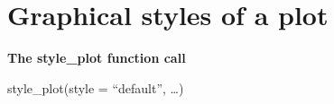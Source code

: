 \documentclass[
  letterpaper,
  DIV=11,
  numbers=noendperiod]{scrreprt}
\begin{document}
\hypertarget{graphical-styles-of-a-plot}{%
\section{Graphical styles of a plot}\label{graphical-styles-of-a-plot}}

\begin{tcolorbox}[enhanced jigsaw, breakable, rightrule=.15mm, bottomrule=.15mm, arc=.35mm, colback=white, colframe=quarto-callout-tip-color-frame, opacityback=0, leftrule=.75mm, toprule=.15mm, left=2mm]
\begin{minipage}[t]{5.5mm}
\textcolor{quarto-callout-tip-color}{\faLightbulb}
\end{minipage}%
\begin{minipage}[t]{\textwidth - 5.5mm}

\textbf{The style\_plot function call}\vspace{2mm}

style\_plot(style = ``default'', \ldots)

\end{minipage}%
\end{tcolorbox}
\end{document}
